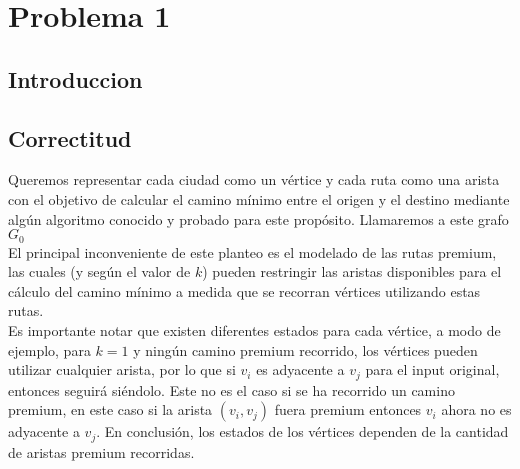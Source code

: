 
\section{Problema 1}

\subsection{Introduccion}

\subsection{Correctitud}
Queremos representar cada ciudad como un vértice y cada ruta como una arista con el objetivo de calcular el camino mínimo entre el origen y el destino mediante algún algoritmo conocido y probado para este propósito. Llamaremos a este grafo $G_0$\\

El principal inconveniente de este planteo es el modelado de las rutas premium, las cuales (y según el valor de $k$) pueden restringir las aristas disponibles para el cálculo del camino mínimo a medida que se recorran vértices utilizando estas rutas.\\

Es importante notar que existen diferentes estados para cada vértice, a modo de ejemplo, para $k=1$ y ningún camino premium recorrido, los vértices pueden utilizar cualquier arista, por lo que si $v_i$ es adyacente a $v_j$ para el input original, entonces seguirá siéndolo. Este no es el caso si se ha recorrido un camino premium, en este caso si la arista $(v_i, v_j)$ fuera premium entonces $v_i$ ahora no es adyacente a $v_j$. En conclusión, los estados de los vértices dependen de la cantidad de aristas premium recorridas.\\

